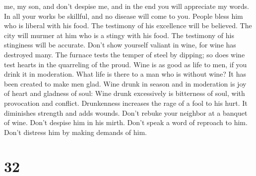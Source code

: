 me, my son, and don't despise me, and in the end you will appreciate my
words. In all your works be skillful, and no disease will come to you.
 People bless him who is liberal with his food. The
testimony of his excellence will be believed.  The city
will murmer at him who is a stingy with his food. The testimony of his
stinginess will be accurate.  Don't show yourself valiant
in wine, for wine has destroyed many.  The furnace tests
the temper of steel by dipping; so does wine test hearts in the
quarreling of the proud.  Wine is as good as life to men,
if you drink it in moderation. What life is there to a man who is
without wine? It has been created to make men glad.  Wine
drunk in season and in moderation is joy of heart and gladness of soul:
 Wine drunk excessively is bitterness of soul, with
provocation and conflict.  Drunkenness increases the rage
of a fool to his hurt. It diminishes strength and adds wounds.
 Don't rebuke your neighbor at a banquet of wine. Don't
despise him in his mirth. Don't speak a word of reproach to him. Don't
distress him by making demands of him.

\hypertarget{section-27}{%
\section{32}\label{section-27}}

